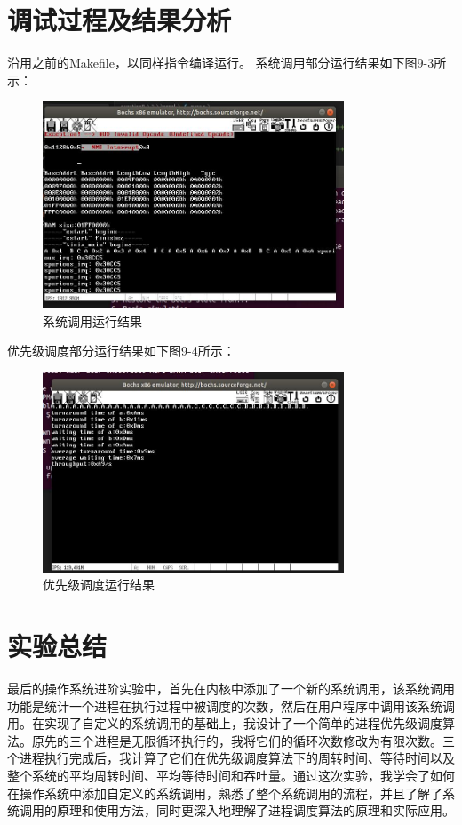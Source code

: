 \section{调试过程及结果分析}
沿用之前的Makefile，以同样指令编译运行。
系统调用部分运行结果如下图9-3所示：
        \begin{figure}[H]
            \centering
            \includegraphics[width=0.8\textwidth]{figures/chapter9/9-3.jpg}
            \caption{系统调用运行结果}
        \end{figure}
优先级调度部分运行结果如下图9-4所示：
        \begin{figure}[H]
            \centering
            \includegraphics[width=0.8\textwidth]{figures/chapter9/9-4.jpg}
            \caption{优先级调度运行结果}
        \end{figure}
\section{实验总结}
最后的操作系统进阶实验中，首先在内核中添加了一个新的系统调用，该系统调用功能是统计一个进程在执行过程中被调度的次数，然后在用户程序中调用该系统调用。在实现了自定义的系统调用的基础上，我设计了一个简单的进程优先级调度算法。原先的三个进程是无限循环执行的，我将它们的循环次数修改为有限次数。三个进程执行完成后，我计算了它们在优先级调度算法下的周转时间、等待时间以及整个系统的平均周转时间、平均等待时间和吞吐量。通过这次实验，我学会了如何在操作系统中添加自定义的系统调用，熟悉了整个系统调用的流程，并且了解了系统调用的原理和使用方法，同时更深入地理解了进程调度算法的原理和实际应用。\par


